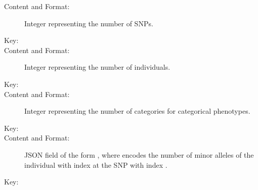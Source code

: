 \documentclass[a4paper,10pt,english]{sphinxhowto}
\begin{document}
\begin{description}
\begin{description}
\begin{description}
\item[{Content and Format:}] \leavevmode
Integer representing the number of SNPs.

\end{description}

\item[{\sphinxcode{\sphinxupquote{\textless{}NUM\_INDS\textgreater{}}}}] \leavevmode\begin{description}
\item[{Key:}] \leavevmode
{}

\item[{Content and Format:}] \leavevmode
Integer representing the number of individuals.

\end{description}

\item[{\sphinxcode{\sphinxupquote{\textless{}NUM\_CATEGORIES\textgreater{}}}}] \leavevmode\begin{description}
\item[{Key:}] \leavevmode
{}

\item[{Content and Format:}] \leavevmode
Integer representing the number of categories for categorical phenotypes.

\end{description}

\item[{\sphinxcode{\sphinxupquote{\textless{}GENOTYPE\_DATA\textgreater{}}}}] \leavevmode\begin{description}
\item[{Key:}] \leavevmode
{}

\item[{Content and Format:}] \leavevmode
JSON field of the form ,
where  encodes the number of minor alleles of the individual with index  at the SNP with index .

\end{description}

\item[{\sphinxcode{\sphinxupquote{\textless{}PHENOTYPE\_DATA\textgreater{}}}}] \leavevmode\begin{description}
\item[{Key:}] \leavevmode
{}


\end{description}
\end{description}
\end{description}
\end{document}

